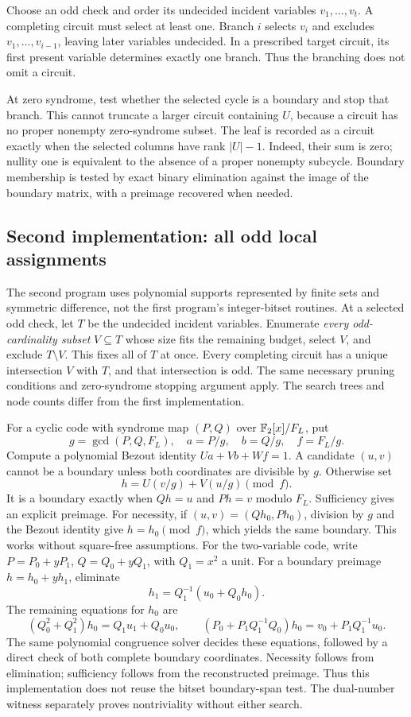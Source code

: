 Choose an odd check and order its undecided incident variables $v_1,\ldots,v_t$. A completing circuit must select at least one. Branch $i$ selects $v_i$ and excludes $v_1,\ldots,v_{i-1}$, leaving later variables undecided. In a prescribed target circuit, its first present variable determines exactly one branch. Thus the branching does not omit a circuit.

At zero syndrome, test whether the selected cycle is a boundary and stop that branch. This cannot truncate a larger circuit containing $U$, because a circuit has no proper nonempty zero-syndrome subset. The leaf is recorded as a circuit exactly when the selected columns have rank $|U|-1$. Indeed, their sum is zero; nullity one is equivalent to the absence of a proper nonempty subcycle. Boundary membership is tested by exact binary elimination against the image of the boundary matrix, with a preimage recovered when needed.

\subsection{Second implementation: all odd local assignments}
The second program uses polynomial supports represented by finite sets and symmetric difference, not the first program's integer-bitset routines. At a selected odd check, let $T$ be the undecided incident variables. Enumerate \emph{every odd-cardinality subset} $V\subseteq T$ whose size fits the remaining budget, select $V$, and exclude $T\setminus V$. This fixes all of $T$ at once. Every completing circuit has a unique intersection $V$ with $T$, and that intersection is odd. The same necessary pruning conditions and zero-syndrome stopping argument apply. The search trees and node counts differ from the first implementation.

For a cyclic code with syndrome map $(P,Q)$ over $\mathbb F_2[x]/F_L$, put
\[
 g=\gcd(P,Q,F_L),\quad a=P/g,\quad b=Q/g,\quad f=F_L/g.
\]
Compute a polynomial Bezout identity $Ua+Vb+Wf=1$. A candidate $(u,v)$ cannot be a boundary unless both coordinates are divisible by $g$. Otherwise set
\[
 h=U(v/g)+V(u/g)\pmod f.
\]
It is a boundary exactly when $Qh=u$ and $Ph=v$ modulo $F_L$. Sufficiency gives an explicit preimage. For necessity, if $(u,v)=(Qh_0,Ph_0)$, division by $g$ and the Bezout identity give $h=h_0\pmod f$, which yields the same boundary. This works without square-free assumptions. For the two-variable code, write $P=P_0+yP_1$, $Q=Q_0+yQ_1$, with $Q_1=x^2$ a unit. For a boundary preimage $h=h_0+yh_1$, eliminate
\[
 h_1=Q_1^{-1}(u_0+Q_0h_0).
\]
The remaining equations for $h_0$ are
\[
 (Q_0^2+Q_1^2)h_0=Q_1u_1+Q_0u_0,\qquad
 (P_0+P_1Q_1^{-1}Q_0)h_0=v_0+P_1Q_1^{-1}u_0.
\]
The same polynomial congruence solver decides these equations, followed by a direct check of both complete boundary coordinates. Necessity follows from elimination; sufficiency follows from the reconstructed preimage. Thus this implementation does not reuse the bitset boundary-span test. The dual-number witness separately proves nontriviality without either search.

